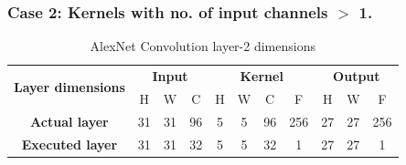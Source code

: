 \subsubsection{Case 2: Kernels with no. of input channels $>$ 1.}

\begin{table}[H]
\centering
\caption{AlexNet Convolution layer-2 dimensions}
\label{tab:permConvolutionCase2Dim}
 \begin{tabular}{|c|c|c|c|c|c|c|c|c|c|c|} \hline  
 
 \multirow{2}{*}{\textbf{Layer dimensions}} &  
 \multicolumn{3}{|c|}{\textbf{Input}} &  
 \multicolumn{4}{|c|}{\textbf{Kernel}} &  
 \multicolumn{3}{|c|}{\textbf{Output}}\\ \cline{2-11}
 & H &  W &  C&  H &  W &  C &  F &  H &  W & F\\ \hline  
 \textbf{Actual layer} &  31 &  31 &  96 & 5 & 5 & 96 & 256 & 27 & 27 & 256\\ \hline 
 \textbf{Executed layer} &  31 &  31 &  \cellcolor{yellow}32 & 5 & 5 & \cellcolor{yellow}32 & \cellcolor{yellow}1 & 27 & 27 & \cellcolor{yellow}1 \\ \hline 
 \end{tabular}
\end{table}


